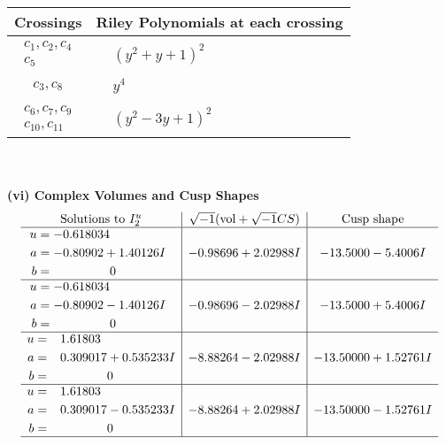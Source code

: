 \documentclass[1p]{elsarticle_modified}
\theoremstyle{definition}
\newcommand{\I}{\sqrt{-1}}
\begin{document}
\begin{tabular}{m{50pt}|m{274pt}}
Crossings & \hspace{64pt}Riley Polynomials at each crossing \\
\hline $$\begin{aligned}c_{1},c_{2},c_{4}\\c_{5}\end{aligned}$$&$\begin{aligned}
&(y^2+y+1)^2
\end{aligned}$\\
\hline $$\begin{aligned}c_{3},c_{8}\end{aligned}$$&$\begin{aligned}
&y^4
\end{aligned}$\\
\hline $$\begin{aligned}c_{6},c_{7},c_{9}\\c_{10},c_{11}\end{aligned}$$&$\begin{aligned}
&(y^2-3 y+1)^2
\end{aligned}$\\
\hline
\end{tabular}\\~\\
\newpage\flushleft \textbf{(vi) Complex Volumes and Cusp Shapes}
$$\begin{array}{c|c|c}  
\text{Solutions to }I^u_{2}& \I (\text{vol} + \sqrt{-1}CS) & \text{Cusp shape}\\
 \hline 
\begin{aligned}
u &= -0.618034\phantom{ +0.000000I} \\
a &= -0.80902 + 1.40126 I \\
b &= \phantom{-0.000000 } 0\end{aligned}
 & -0.98696 + 2.02988 I & -13.5000 - 5.4006 I \\ \hline\begin{aligned}
u &= -0.618034\phantom{ +0.000000I} \\
a &= -0.80902 - 1.40126 I \\
b &= \phantom{-0.000000 } 0\end{aligned}
 & -0.98696 - 2.02988 I & -13.5000 + 5.4006 I \\ \hline\begin{aligned}
u &= \phantom{-}1.61803\phantom{ +0.000000I} \\
a &= \phantom{-}0.309017 + 0.535233 I \\
b &= \phantom{-0.000000 } 0\end{aligned}
 & -8.88264 - 2.02988 I & -13.50000 + 1.52761 I \\ \hline\begin{aligned}
u &= \phantom{-}1.61803\phantom{ +0.000000I} \\
a &= \phantom{-}0.309017 - 0.535233 I \\
b &= \phantom{-0.000000 } 0\end{aligned}
 & -8.88264 + 2.02988 I & -13.50000 - 1.52761 I\\
 \hline 
 \end{array}$$\newpage
\end{document}
